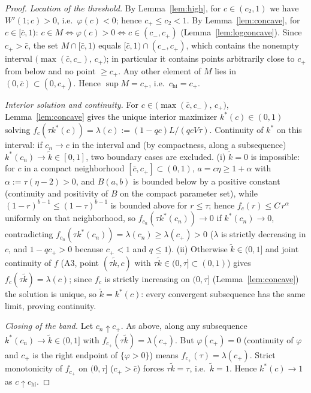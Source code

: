 \begin{proof}
\emph{Location of the threshold.} By Lemma~\ref{lem:high}, for $c \in (c_2, 1)$ we have
$W'(1; c) > 0$, i.e.\ $\varphi(c) < 0$; hence $c_+ \le c_2 < 1$. By
Lemma~\ref{lem:concave}, for $c \in [\bar c, 1)$:
$c \in M \iff \varphi(c) > 0 \iff c \in (c_-, c_+)$ (Lemma~\ref{lem:logconcave}). Since
$c_+ > \bar c$, the set $M \cap [\bar c, 1)$ equals $[\bar c, 1) \cap (c_-, c_+)$,
which contains the nonempty interval $\bigl( \max(\bar c, c_-),\, c_+ \bigr)$; in
particular it contains points arbitrarily close to $c_+$ from below and no point
$\ge c_+$. Any other element of $M$ lies in $(0, \bar c) \subset (0, c_+)$. Hence
$\sup M = c_+$, i.e.\ $c_{\mathrm{hi}} = c_+$.

\emph{Interior solution and continuity.} For
$c \in \bigl( \max(\bar c, c_-),\, c_+ \bigr)$, Lemma~\ref{lem:concave} gives the
unique interior maximizer $k^*(c) \in (0,1)$ solving
$f_c(\tau k^*(c)) = \lambda(c) := (1 - qc)L/(qcV\tau)$. Continuity of $k^*$ on this
interval: if $c_n \to c$ in the interval and (by compactness, along a subsequence)
$k^*(c_n) \to \tilde k \in [0,1]$, two boundary cases are excluded. (i) $\tilde k = 0$
is impossible: for $c$ in a compact neighborhood $[\bar c, c_+] \subset (0,1)$,
$a = c\eta \ge 1 + \alpha$ with $\alpha := \tau(\eta - 2) > 0$, and $B(a, b)$ is
bounded below by a positive constant (continuity and positivity of $B$ on the compact
parameter set), while $(1 - r)^{b-1} \le (1 - \tau)^{b-1}$ is bounded above for
$r \le \tau$; hence $f_c(r) \le C\, r^{\alpha}$ uniformly on that neighborhood, so
$f_{c_n}(\tau k^*(c_n)) \to 0$ if $k^*(c_n) \to 0$, contradicting
$f_{c_n}(\tau k^*(c_n)) = \lambda(c_n) \ge \lambda(c_+) > 0$ ($\lambda$ is strictly
decreasing in $c$, and $1 - qc_+ > 0$ because $c_+ < 1$ and $q \le 1$). (ii) Otherwise
$\tilde k \in (0,1]$ and joint continuity of $f$ (A3, point $(\tau\tilde k, c)$ with
$\tau\tilde k \in (0, \tau] \subset (0,1)$) gives $f_c(\tau\tilde k) = \lambda(c)$;
since $f_c$ is strictly increasing on $(0, \tau]$ (Lemma~\ref{lem:concave}) the
solution is unique, so $\tilde k = k^*(c)$: every convergent subsequence has the same
limit, proving continuity.

\emph{Closing of the band.} Let $c_n \uparrow c_+$. As above, along any subsequence
$k^*(c_n) \to \tilde k \in (0,1]$ with $f_{c_+}(\tau\tilde k) = \lambda(c_+)$. But
$\varphi(c_+) = 0$ (continuity of $\varphi$ and $c_+$ is the right endpoint of
$\{\varphi > 0\}$) means $f_{c_+}(\tau) = \lambda(c_+)$. Strict monotonicity of
$f_{c_+}$ on $(0, \tau]$ ($c_+ > \bar c$) forces $\tau\tilde k = \tau$, i.e.\
$\tilde k = 1$. Hence $k^*(c) \to 1$ as $c \uparrow c_{\mathrm{hi}}$.
\end{proof}

